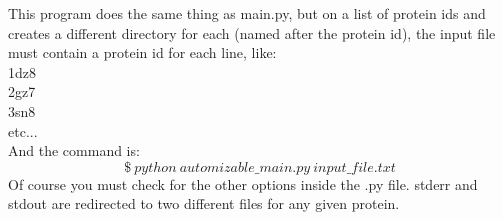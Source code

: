 			This program does the same thing as main.py, but on a list of protein ids and creates a different directory for each (named after the protein id), the input file must contain a protein id for each line, like:\\
			1dz8\\
			2gz7\\
			3sn8\\
			etc...\\
			$ $\\
			And the command is:
			\[
			\$\ python\ automizable\_main.py\ input\_file.txt
			\]
			Of course you must check for the other options inside the .py file. stderr and stdout are redirected to two different files for any given protein.
				